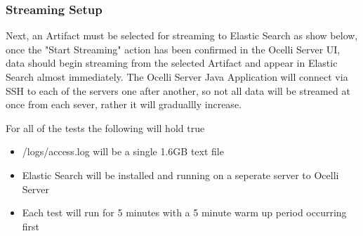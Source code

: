 \documentclass{llncs}
\begin{document}
\subsubsection{Streaming Setup}
Next, an Artifact must be selected for streaming to Elastic Search as show below, once the "Start Streaming" action has been confirmed in the Ocelli Server UI, data should begin streaming from the selected Artifact and appear in Elastic Search almost immediately. The Ocelli Server Java Application will connect via SSH to each of the servers one after another, so not all data will be streamed at once from each sever, rather it will graduallly increase.\newline\newline

For all of the tests the following will hold true

\begin{itemize}
\item /logs/access.log will be a single 1.6GB text file
\item Elastic Search will be installed and running on a seperate server to Ocelli Server
\item Each test will run for 5 minutes with a 5 minute warm up period occurring first
\end{itemize}
\end{document}
